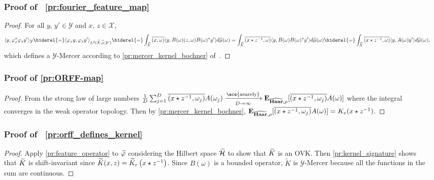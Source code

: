 \subsubsection{Proof of~%
\texorpdfstring{\cref{pr:fourier_feature_map}}{Proposition~%
\ref{pr:fourier_feature_map}}}
\begin{proof}
    For all $y$, $y'\in \mathcal{Y}$ and $x$, $z\in\mathcal{X}$,
    \begin{dmath*}
        \inner{y, \Phi_x^\adjoint \Phi_z y'}_{\mathcal{Y}} \hiderel{=}
        \inner{\Phi_x y, \Phi_z
        y'}_{L^2(\dual{\mathcal{X}},\dual{\mu};\mathcal{Y}')}
        \hiderel{=} \int_{\dual{\mathcal{X}}}\conj{\pairing{x,\omega}}\inner{y,
        B(\omega)\pairing{z,\omega}B(\omega)^\adjoint y'}d\dual{\mu}(\omega)
        = \int_{\dual{\mathcal{X}}}\conj{\pairing{x \groupop
        \myinv{z},\omega}}\inner{y, B(\omega)B(\omega)^\adjoint
        y'}d\dual{\mu}(\omega)
        \hiderel{=} \int_{\dual{\mathcal{X}}}\conj{\pairing{x \groupop
        \inv{z},\omega}}\inner{y,A(\omega)y'}d\dual{\mu}(\omega),
    \end{dmath*}
    which defines a $\mathcal{Y}$-Mercer according to
    \cref{pr:mercer_kernel_bochner} of~\citet{Carmeli2010}.
\end{proof}
\subsubsection{Proof of \texorpdfstring{\cref{pr:ORFF-map}}{Proposition~%
\ref{pr:ORFF-map}}}
\begin{proof}
    From the strong law of large numbers $\frac{1}{D} \sum_{j=1}^D
    \conj{\pairing{x\groupop\inv{z},\omega_j}} A(\omega_j)
    \converges{\acs{asurely}}{D \to \infty} \expectation_{\dual{\Haar},
    \rho}[\conj{\pairing{x \groupop z^{-1}, \omega_j} }A(\omega)]$ where the
    integral converges in the weak operator topology. Then by
    \cref{pr:mercer_kernel_bochner}, ${\mathbf{{E}}}_{\widehat{\mathbf{Haar}},
    \rho}[\overline{(x \star z^{-1}, \omega_j)}A(\omega)]
    =K_e(x\star{z}^{-1})$.
\end{proof}
\subsubsection{Proof of~%
\texorpdfstring{\cref{pr:orff_defines_kernel}}{Proposition~%
\ref{pr:orff_defines_kernel}}}
\begin{proof}
    Apply \cref{pr:feature_operator} to $\tildePhi{\omega}$ considering the
    Hilbert space $\widetilde{\mathcal{H}}$ to show that $\widetilde{K}$ is an
    \acs{OVK}. Then \cref{pr:kernel_signature} shows that $\widetilde{K}$ is
    shift-invariant since
    $\widetilde{K}(x,z)=\widetilde{K}_e\left(x\star z^{-1}\right)$.
    Since $B(\omega)$ is a bounded operator, $\widetilde{K}$ is
    $\mathcal{Y}$-Mercer because all the functions in the sum are continuous.
\end{proof}
